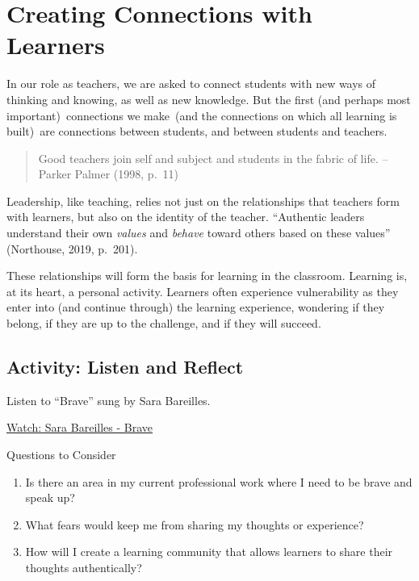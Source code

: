 \documentclass[
]{book}
\providecommand{\tightlist}{%
  \setlength{\itemsep}{0pt}\setlength{\parskip}{0pt}}
\begin{document}
\hypertarget{creating-connections-with-learners}{%
\section{Creating Connections with Learners}\label{creating-connections-with-learners}}

In our role as teachers, we are asked to connect students with new ways of thinking and knowing, as well as new knowledge. But the first (and perhaps most important)~connections we make~(and the connections on which all learning is built)~are connections between students, and between students and teachers.

\begin{quote}
Good teachers join self and subject and students in the fabric of life. -- Parker Palmer (1998, p.~11)
\end{quote}

Leadership, like teaching, relies not just on the relationships that teachers form with learners, but also on the identity of the teacher. ``Authentic leaders understand their own \emph{values} and \emph{behave} toward others based on these values'' (Northouse, 2019, p.~201).

These relationships will form the basis for learning in the classroom. Learning is, at its heart, a personal activity. Learners often experience vulnerability as they enter into (and continue through) the learning experience, wondering if they belong, if they are up to the challenge, and if they will succeed.

\hypertarget{activity-listen-and-reflect}{%
\subsection*{Activity: Listen and Reflect}\label{activity-listen-and-reflect}}

\begin{reflect}
Listen to ``Brave'' sung by Sara Bareilles.

\href{https://www.youtube.com/watch?v=QUQsqBqxoR4}{Watch: Sara Bareilles - Brave}

{Questions to Consider}

\begin{enumerate}
\def\labelenumi{\arabic{enumi}.}
\tightlist
\item
  Is there an area in my current professional work where I need to be brave and speak up?\\
\item
  What fears would keep me from sharing my thoughts or experience?\\
\item
  How will I create a learning community that allows learners to share their thoughts authentically?
\end{enumerate}
\end{reflect}
\end{document}
